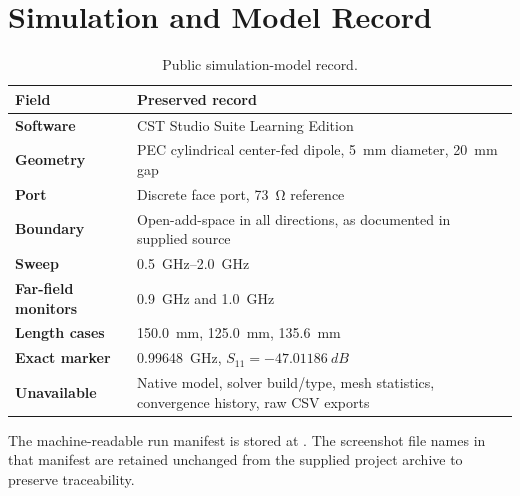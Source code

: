 \chapter{Simulation and Model Record}
\label{app:simulation-record}

\begin{table}[H]
\centering
\caption{Public simulation-model record.}
\begin{tabularx}{\textwidth}{>{\bfseries}p{}X}
\toprule
Field & Preserved record \\
\midrule
Software & CST Studio Suite Learning Edition \\
Geometry & PEC cylindrical center-fed dipole, \SI{5}{mm} diameter, \SI{20}{mm} gap \\
Port & Discrete face port, \SI{73}{\ohm} reference \\
Boundary & Open-add-space in all directions, as documented in supplied source \\
Sweep & \SIrange{0.5}{2.0}{GHz} \\
Far-field monitors & \SI{0.9}{GHz} and \SI{1.0}{GHz} \\
Length cases & \SI{150.0}{mm}, \SI{125.0}{mm}, \SI{135.6}{mm} \\
Exact marker & \SI{0.99648}{GHz}, $S_{11}=-\SI{47.01186}{dB}$ \\
Unavailable & Native model, solver build/type, mesh statistics, convergence history, raw CSV exports \\
\bottomrule
\end{tabularx}
\end{table}

The machine-readable run manifest is stored at
. The screenshot file names in that
manifest are retained unchanged from the supplied project archive to preserve traceability.
